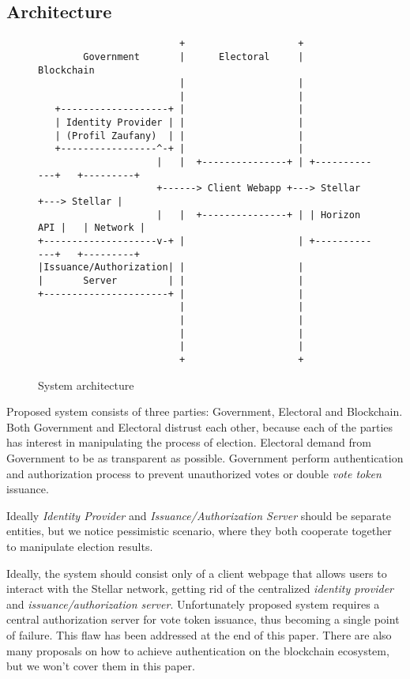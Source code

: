 \documentclass[runningheads]{llncs}
\begin{document}
\subsection{Architecture}
\begin{figure}
\begin{verbatim}
                         +                    +
        Government       |      Electoral     |      Blockchain
                         |                    |
                         |                    |
   +-------------------+ |                    |
   | Identity Provider | |                    |
   | (Profil Zaufany)  | |                    |
   +-----------------^-+ |                    |
                     |   |  +---------------+ | +-------------+   +---------+
                     +------> Client Webapp +---> Stellar     +---> Stellar |
                     |   |  +---------------+ | | Horizon API |   | Network |
+--------------------v-+ |                    | +-------------+   +---------+
|Issuance/Authorization| |                    |
|       Server         | |                    |
+----------------------+ |                    |
                         |                    |
                         |                    |
                         |                    |
                         |                    |
                         +                    +

\end{verbatim}
\caption{System architecture}
\label{fig:ascii-box}
\end{figure} 

Proposed system consists of three parties: Government, Electoral and Blockchain. Both Government and Electoral distrust each other, because each of the parties has interest in manipulating the process of election. Electoral demand from Government to be as transparent as possible. Government perform authentication and authorization process to prevent unauthorized votes or double \textit{vote token} issuance.

Ideally \textit{Identity Provider} and \textit{Issuance/Authorization Server} should be separate entities, but we notice pessimistic scenario, where they both cooperate together to manipulate election results.

Ideally, the system should consist only of a client webpage that allows users to interact with the Stellar network, getting rid of the centralized \textit{identity provider} and \textit{issuance/authorization server}. Unfortunately proposed system requires a central authorization server for vote token issuance, thus becoming a single point
of failure. This flaw has been addressed at the end of this paper. There are also many proposals on how to achieve authentication on the blockchain ecosystem, but we won't cover them in this paper.
\end{document}

